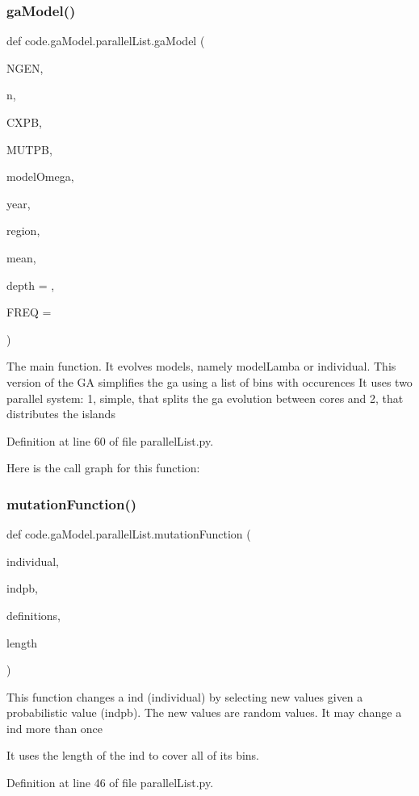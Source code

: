 \subsubsection{\texorpdfstring{ga\+Model()}{gaModel()}}
{\footnotesize\ttfamily def code.\+ga\+Model.\+parallel\+List.\+ga\+Model (\begin{DoxyParamCaption}\item[{}]{N\+G\+EN,  }\item[{}]{n,  }\item[{}]{C\+X\+PB,  }\item[{}]{M\+U\+T\+PB,  }\item[{}]{model\+Omega,  }\item[{}]{year,  }\item[{}]{region,  }\item[{}]{mean,  }\item[{}]{depth = {},  }\item[{}]{F\+R\+EQ = {} }\end{DoxyParamCaption})}

\begin{DoxyVerb}The main function. It evolves models, namely modelLamba or individual. 
This version of the GA simplifies the ga using a list of bins with occurences
It uses two parallel system: 1, simple, that splits the ga evolution between cores
and 2, that distributes the islands
\end{DoxyVerb}
 

Definition at line 60 of file parallel\+List.\+py.

Here is the call graph for this function\+:
\mbox{\label{namespacecode_1_1ga_model_1_1parallel_list_a89410c99c222011f45e18b728f2f1d7e}} 
\subsubsection{\texorpdfstring{mutation\+Function()}{mutationFunction()}}
{\footnotesize\ttfamily def code.\+ga\+Model.\+parallel\+List.\+mutation\+Function (\begin{DoxyParamCaption}\item[{}]{individual,  }\item[{}]{indpb,  }\item[{}]{definitions,  }\item[{}]{length }\end{DoxyParamCaption})}

\begin{DoxyVerb}This function changes a ind (individual) by selecting new values given a probabilistic value (indpb).
The new values are random values. It may change a ind more than once

It uses the length of the ind to cover all of its bins.
\end{DoxyVerb}
 

Definition at line 46 of file parallel\+List.\+py.

